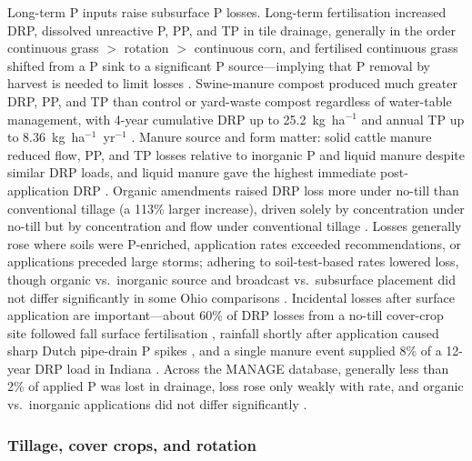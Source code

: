 Long-term P inputs raise subsurface P losses. Long-term fertilisation increased DRP, dissolved
unreactive P, PP, and TP in tile drainage, generally in the order continuous grass $>$ rotation
$>$ continuous corn, and fertilised continuous grass shifted from a P sink to a significant P
source---implying that P removal by harvest is needed to limit losses
\parencite{Zhang2015b}. Swine-manure compost produced much greater DRP, PP, and TP than control
or yard-waste compost regardless of water-table management, with 4-year cumulative DRP up to
25.2~kg~ha$^{-1}$ and annual TP up to 8.36~kg~ha$^{-1}$~yr$^{-1}$ \parencite{Zhang2015}. Manure
source and form matter: solid cattle manure reduced flow, PP, and TP losses relative to
inorganic P and liquid manure despite similar DRP loads, and liquid manure gave the highest
immediate post-application DRP \parencite{Wang2018}. Organic amendments raised DRP loss more
under no-till than conventional tillage (a 113\% larger increase), driven solely by
concentration under no-till but by concentration and flow under conventional tillage
\parencite{Zhang2017}. Losses generally rose where soils were P-enriched, application rates
exceeded recommendations, or applications preceded large storms; adhering to soil-test-based
rates lowered loss, though organic vs.\ inorganic source and broadcast vs.\ subsurface placement
did not differ significantly in some Ohio comparisons \parencite{King2018}. Incidental losses
after surface application are important---about 60\% of DRP losses from a no-till cover-crop site
followed fall surface fertilisation \parencite{Macrae2023}, rainfall shortly after application
caused sharp Dutch pipe-drain P spikes \parencite{vanderSalm2012}, and a single manure event
supplied 8\% of a 12-year DRP load in Indiana \parencite{Mumbi2025b}. Across the MANAGE database,
generally less than 2\% of applied P was lost in drainage, loss rose only weakly with rate, and
organic vs.\ inorganic applications did not differ significantly \parencite{Christianson2016}.

\subsubsection{Tillage, cover crops, and rotation}

